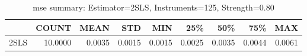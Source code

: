 \begin{table}[ht]
\centering
\caption{mse summary: Estimator=2SLS, Instruments=125, Strength=0.80}
\begin{tabular}{lrrrrrrrr}
\toprule
 & COUNT & MEAN & STD & MIN & 25\% & 50\% & 75\% & MAX \\
\midrule
2SLS & 10.0000 & 0.0035 & 0.0015 & 0.0015 & 0.0025 & 0.0035 & 0.0044 & 0.0061 \\
\bottomrule
\end{tabular}
\end{table}
